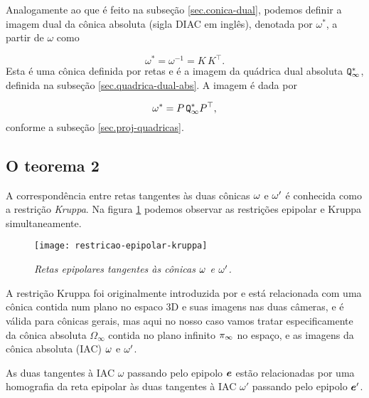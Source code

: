 Analogamente ao que é feito na subseção \ref{sec.conica-dual}, podemos definir a imagem dual da cônica absoluta (sigla DIAC em inglês), denotada por $\omega^*$, a partir de $\omega$ como

\begin{equation*}
\omega^*=\omega^{-1}=K\,K^\top.
\end{equation*}
Esta é uma cônica definida por retas e é a imagem da quádrica dual absoluta ${\tt Q^*_\infty}$, definida na subseção \ref{sec.quadrica-dual-abs}. A imagem é dada por

\begin{equation*}
\omega^*=P\,{\tt Q^*_\infty}P^\top,
\end{equation*}
conforme a subseção \ref{sec.proj-quadricas}.\\

\subsection{O teorema 2}\label{sec.teorema-2}

A correspondência entre retas tangentes às duas cônicas ${\bf \omega}$ e ${\bf \omega'}$ é conhecida como a restrição \textit{Kruppa}. Na figura \ref{epipolar-kruppa} podemos observar as restrições epipolar e Kruppa simultaneamente.

\begin{figure}[!htb]
\centering
\texttt{[image: restricao-epipolar-kruppa]}
\caption{\textit{Retas epipolares tangentes às cônicas ${\bf \omega}$ e ${\bf \omega'}$.}}
\label{epipolar-kruppa}
\end{figure}

A restrição Kruppa foi originalmente introduzida por \cite{faugeras92} e está relacionada com uma cônica contida num plano no espaco 3D e suas imagens nas duas câmeras, e é válida para cônicas gerais, mas aqui no nosso caso vamos tratar especificamente da cônica absoluta $\Omega_\infty$ contida no plano infinito $\pi_\infty$ no espaço, e as imagens da cônica absoluta (IAC) ${\bf \omega}$ e ${\bf \omega'}$.

\begin{teorema}
As duas tangentes à IAC $\omega$ passando pelo epipolo $\boldsymbol{e}$ estão relacionadas por uma homografia da reta epipolar às duas tangentes à IAC $\omega'$ passando pelo epipolo $\boldsymbol{e}'$.
\end{teorema}

